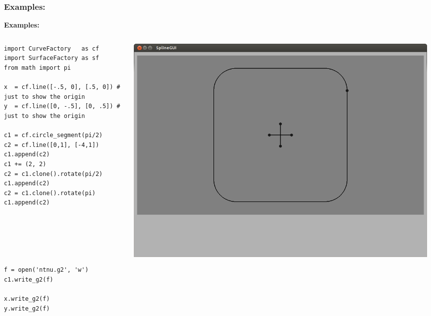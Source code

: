\documentclass{beamer}
\theoremstyle{plain}
\theoremstyle{definition}
\begin{document}
\begin{frame}[fragile]
\frametitle{Examples:}
\textbf{Examples:}
\begin{columns}
    \begin{column}{.50\linewidth}
        \begin{listing}[H]
            \tiny
            \begin{verbatim}
import CurveFactory   as cf
import SurfaceFactory as sf
from math import pi

x  = cf.line([-.5, 0], [.5, 0]) # just to show the origin
y  = cf.line([0, -.5], [0, .5]) # just to show the origin

c1 = cf.circle_segment(pi/2)
c2 = cf.line([0,1], [-4,1])
c1.append(c2)
c1 += (2, 2)
c2 = c1.clone().rotate(pi/2)
c1.append(c2)
c2 = c1.clone().rotate(pi)
c1.append(c2)






f = open('ntnu.g2', 'w')
c1.write_g2(f)

x.write_g2(f)
y.write_g2(f)
            \end{verbatim}
        \end{listing}
    \end{column}
    \begin{column}{.45\linewidth}
        \includegraphics[width=\linewidth]{ntnu3}
    \end{column}
\end{columns}

\end{frame}

\end{document}
